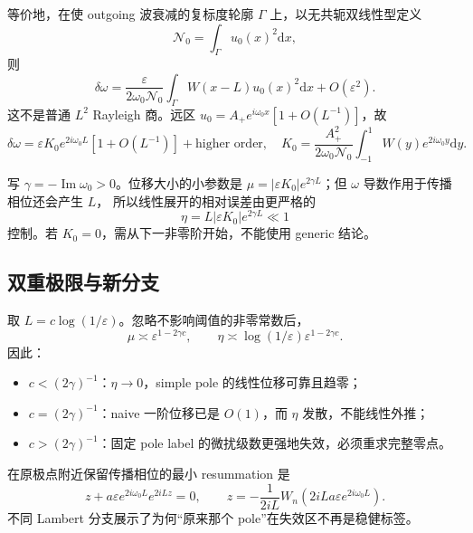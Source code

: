 \documentclass[UTF8,11pt,a4paper]{ctexart}
\theoremstyle{definition}
\newcommand{\dd}{\mathrm d}
\newcommand{\eps}{\varepsilon}
\newcommand{\om}{\omega}
\begin{document}
等价地，在使 outgoing 波衰减的复标度轮廓 $\Gamma$ 上，以无共轭双线性型定义
\[
\mathcal N_0=\int_\Gamma u_0(x)^2\dd x,
\]
则
\begin{equation}
\delta\om=
\frac{\eps}{2\om_0\mathcal N_0}
\int_\Gamma W(x-L)u_0(x)^2\dd x+O(\eps^2).                \tag{13}
\end{equation}
这不是普通 $L^2$ Rayleigh 商。远区 $u_0=A_+e^{i\om_0x}[1+O(L^{-1})]$，故
\begin{equation}
\delta\om=\eps K_0e^{2i\om_0L}[1+O(L^{-1})]+\text{higher order},
\quad
K_0=\frac{A_+^2}{2\om_0\mathcal N_0}
\int_{-1}^1W(y)e^{2i\om_0y}\dd y.                         \tag{14}
\end{equation}

写 $\gamma=-\operatorname{Im}\om_0>0$。位移大小的小参数是
$\mu=|\eps K_0|e^{2\gamma L}$；但 $\om$ 导数作用于传播相位还会产生 $L$，
所以线性展开的相对误差由更严格的
\begin{equation}
\boxed{\eta=L|\eps K_0|e^{2\gamma L}\ll1}                 \tag{15}
\end{equation}
控制。若 $K_0=0$，需从下一非零阶开始，不能使用 generic 结论。

\subsection{双重极限与新分支}

取 $L=c\log(1/\eps)$。忽略不影响阈值的非零常数后，
\begin{equation}
\mu\asymp\eps^{1-2\gamma c},\qquad
\eta\asymp\log(1/\eps)\eps^{1-2\gamma c}.               \tag{16}
\end{equation}
因此：
\begin{itemize}
\item $c<(2\gamma)^{-1}$：$\eta\to0$，simple pole 的线性位移可靠且趋零；
\item $c=(2\gamma)^{-1}$：naive 一阶位移已是 $O(1)$，而 $\eta$ 发散，不能线性外推；
\item $c>(2\gamma)^{-1}$：固定 pole label 的微扰级数更强地失效，必须重求完整零点。
\end{itemize}

在原极点附近保留传播相位的最小 resummation 是
\[
z+a\eps e^{2i\om_0L}e^{2iLz}=0,
\qquad
z=-\frac{1}{2iL}W_n\!\left(2iLa\eps e^{2i\om_0L}\right). \tag{17}
\]
不同 Lambert 分支展示了为何“原来那个 pole”在失效区不再是稳健标签。
\end{document}
